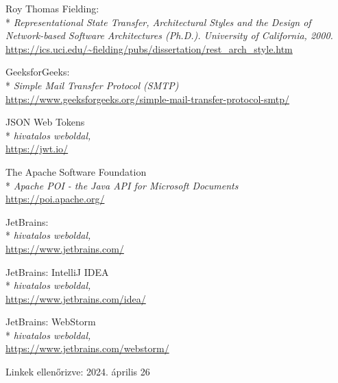 \begin{thebibliography}{x}
 Roy Thomas Fielding:\\*
\textit{Representational State Transfer,
Architectural Styles and the Design of Network-based Software Architectures (Ph.D.).
University of California,
2000.}
\\ \url{https://ics.uci.edu/~fielding/pubs/dissertation/rest_arch_style.htm}

 GeeksforGeeks: \\*
\textit{Simple Mail Transfer Protocol (SMTP)}
\\ \url{https://www.geeksforgeeks.org/simple-mail-transfer-protocol-smtp/}

 JSON Web Tokens\\*
\textit{hivatalos weboldal,}
\\ \url{https://jwt.io/}

 The Apache Software Foundation\\*
\textit{Apache POI - the Java API for Microsoft Documents}
\\ \url{https://poi.apache.org/}

 JetBrains:\\*
\textit{hivatalos weboldal,}
\\ \url{https://www.jetbrains.com/}

 JetBrains: IntelliJ IDEA\\*
\textit{hivatalos weboldal,}
\\ \url{https://www.jetbrains.com/idea/}

 JetBrains: WebStorm\\*
\textit{hivatalos weboldal,}
\\ \url{https://www.jetbrains.com/webstorm/}

\end{thebibliography}

Linkek ellenőrizve: 2024. április 26